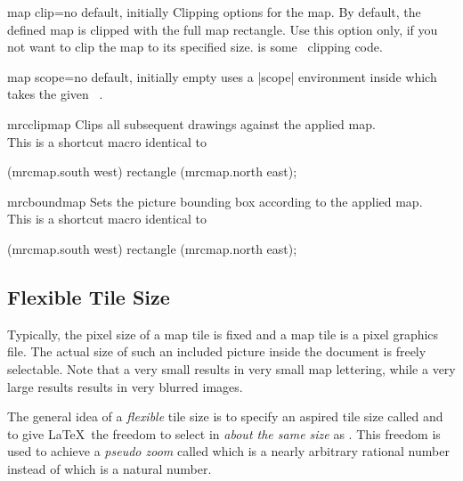 \begin{docMrcKey}{map clip}{=}{no default, initially }
  Clipping options for the map. By default, the defined map is
  clipped with the full map rectangle. Use this option only, if you not want to clip
  the map to its specified size.  is some \tikzname\ clipping code.
\end{docMrcKey}

\begin{docMrcKey}{map scope}{=}{no default, initially empty}
   uses a |scope| environment inside which takes
  the given \tikzname\ .
\end{docMrcKey}


\begin{docCommand}{mrcclipmap}{}
  Clips all subsequent drawings against the applied map.\\
  This is a shortcut macro identical to
  \begin{dispListing}
  \path[clip] (mrcmap.south west) rectangle (mrcmap.north east);
  \end{dispListing}
\end{docCommand}


\begin{docCommand}{mrcboundmap}{}
  Sets the picture bounding box according to the applied map.\\
  This is a shortcut macro identical to
  \begin{dispListing}
    (mrcmap.south west) rectangle (mrcmap.north east);
  \end{dispListing}
\end{docCommand}


\clearpage
\subsection{Flexible Tile Size}\label{sec:flexible_tile_size}

Typically, the pixel size of a map tile is fixed and a map tile is a
pixel graphics file. The actual size of such an included picture inside
the document is freely selectable. Note that a very small
 results in very small map lettering,
while a very large  results results in
very blurred images.

The general idea of a \emph{flexible} tile size is to specify an aspired
tile size called  and to give \LaTeX\
the freedom to select  in \emph{about the same size}
as \refKey{mermap/flex tile size}.
This freedom is used to achieve a \emph{pseudo zoom} called
 which is a nearly arbitrary rational number instead
of \refKey{mermap/supply/zoom} which is a natural number.

